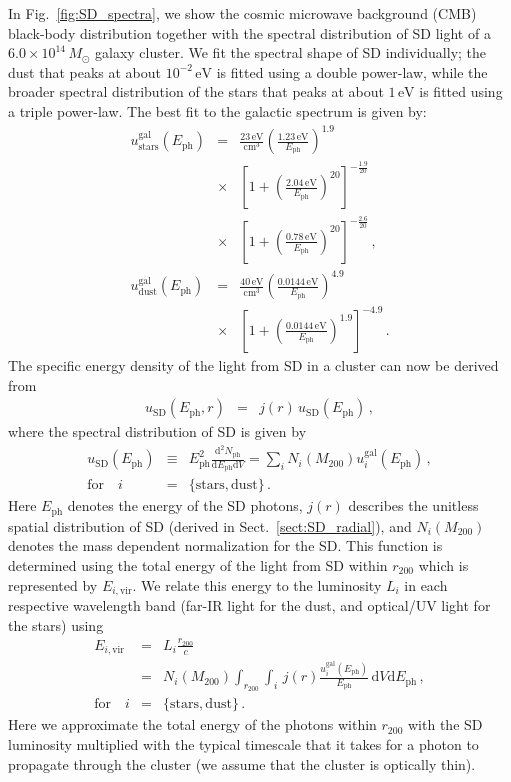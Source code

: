 \documentclass[10pt,aps,pra,reprint,amsmath,amsfonts,amssymb,showpacs,nofootinbib,floatfix]{revtex4-1}
\newcommand{\rmn}{\mathrm}
\newcommand{\ph}{\rmn{ph}}
\newcommand{\eph}{E_\ph}
\newcommand{\vir}{\rmn{vir}}
\newcommand{\gal}{\rmn{gal}}
\newcommand{\sd}{\rmn{SD}}
\newcommand{\msun}{M_\odot}
\newcommand{\stars}{\rmn{stars}}
\newcommand{\dust}{\rmn{dust}}
\newcommand{\ev}{\rmn{eV}}
\newcommand{\dd}{\rmn{d}}
\newcommand{\rvir}{r_{200}}
\newcommand{\mvir}{M_{200}}
\begin{document}
In Fig.~\ref{fig:SD_spectra}, we show the cosmic microwave background
(CMB) black-body distribution together with the spectral distribution
of SD light of a $6.0\times10^{14}\,\msun$ galaxy cluster. We fit the
spectral shape of SD individually; the dust that peaks at about
$10^{-2}\,\ev$ is fitted using a double power-law, while the broader
spectral distribution of the stars that peaks at about $1\,\ev$ is
fitted using a triple power-law. The best fit to the galactic spectrum
is given by:
\begin{eqnarray}
  u_\stars^\gal(\eph) &=& \frac{23\,\rmn{eV}}{\rmn{cm}^3} 
  \left(\frac{1.23\,\rmn{eV}}{\eph}\right)^{1.9} \nonumber \\
  &\times&\left[1+\left(\frac{2.04\,\rmn{eV}}{\eph}\right)^{20}\right]
  ^{-\frac{1.9}{20}}\nonumber \\
  &\times& \left[1+\left(\frac{0.78\,\rmn{eV}}{\eph}\right)^{20}\right]^{-\frac{2.6}{20}}\,, \\
  u_\dust^\gal(\eph) &=& 
  \frac{40\,\rmn{eV}}{\rmn{cm}^3} 
  \left(\frac{0.0144\,\rmn{eV}}{\eph}\right)^{4.9}\nonumber \\
  &\times& \left[1+\left(\frac{0.0144\,\rmn{eV}}{\eph}\right)^{1.9}\right]^{-4.9}\,.
\end{eqnarray}
The specific energy density of the light from SD in a cluster can now
be derived from
\begin{eqnarray} 
u_\sd(\eph, r) &=& j(r)\,u_\sd(\eph)\,,
\label{eq:u_SD_er}
\end{eqnarray}
where the spectral distribution of SD is given by
\begin{eqnarray}
  u_\sd(\eph) &\equiv& \eph^2\frac{\dd^2 N_\ph}{\dd \eph \dd V}
  =  \sum_i N_i(\mvir) u_i^\gal(\eph)\,,\nonumber \\ 
\rmn{for}\quad i&=&\{\rmn{stars,dust}\}\,.
\end{eqnarray}
Here $\eph$ denotes the energy of the SD photons, $j(r)$ describes the
unitless spatial distribution of SD (derived in
Sect.~\ref{sect:SD_radial}), and $N_i(\mvir)$ denotes the mass
dependent normalization for the SD. This function is determined using
the total energy of the light from SD within $\rvir$ which is
represented by $E_{i,\vir}$. We relate this energy to the luminosity
$L_i$ in each respective wavelength band (far-IR light for the
dust, and optical/UV light for the stars) using
\begin{eqnarray} 
  E_{i,\vir} &=& L_i \frac{\rvir}{c} \nonumber \\
  &=&N_i(\mvir)\int_{\rvir} \int_i \,j(r) 
  \frac{u_i^\gal(\eph)}{\eph}\,\dd V\dd \eph\,,\nonumber \\
 \rmn{for}\quad i&=&\{\rmn{stars,dust}\}\,.
\label{eq:E_SD}
\end{eqnarray}
Here we approximate the total energy of the photons within $\rvir$
with the SD luminosity multiplied with the typical timescale that it
takes for a photon to propagate through the cluster (we assume that
the cluster is optically thin).
\end{document}
